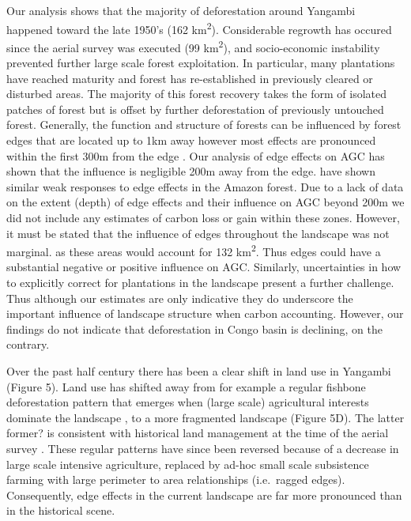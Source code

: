 \documentclass[remote sensing,article,submit,moreauthors,pdftex,10pt,a4paper]{mdpi}
\begin{document}
Our analysis shows that the majority of deforestation around Yangambi
happened toward the late 1950's (162 km\textsuperscript{2}).
Considerable regrowth has occured since the aerial survey was executed
(99 km\textsuperscript{2}), and socio-economic instability prevented
further large scale forest exploitation. In particular, many plantations
have reached maturity and forest has re-established in previously
cleared or disturbed areas. The majority of this forest recovery takes
the form of isolated patches of forest but is offset by further
deforestation of previously untouched forest. Generally, the function
and structure of forests can be influenced by forest edges that are
located up to 1km away however most effects are pronounced within the
first 300m from the edge \citep{gascon2000}. Our analysis of edge
effects on AGC has shown that the influence is negligible 200m away from
the edge. \citet{phillips2006} have shown similar weak responses to edge
effects in the Amazon forest. Due to a lack of data on the extent
(depth) of edge effects and their influence on AGC beyond 200m we did
not include any estimates of carbon loss or gain within these zones.
However, it must be stated that the influence of edges throughout the
landscape was not marginal. as these areas would account for 132
km\textsuperscript{2}. Thus edges could have a substantial negative
\citep{brinck2017} or positive \citep{reinmann2017} influence on AGC.
Similarly, uncertainties in how to explicitly correct for plantations in
the landscape present a further challenge. Thus although our estimates
are only indicative they do underscore the important influence of
landscape structure when carbon accounting. However, our findings do not
indicate that deforestation in Congo basin is declining, on the
contrary.

Over the past half century there has been a clear shift in land use in
Yangambi (Figure 5). Land use has shifted away from for example a
regular fishbone deforestation pattern that emerges when (large scale)
agricultural interests dominate the landscape \citep{arima2015}, to a
more fragmented landscape (Figure 5D). The latter former? is consistent
with historical land management at the time of the aerial survey
\citep{bustillo2018}. These regular patterns have since been reversed
because of a decrease in large scale intensive agriculture, replaced by
ad-hoc small scale subsistence farming with large perimeter to area
relationships (i.e.~ragged edges). Consequently, edge effects in the
current landscape are far more pronounced than in the historical scene.
\end{document}
